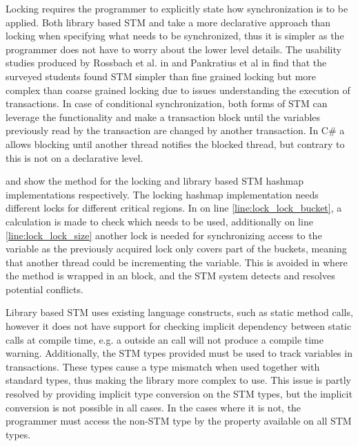 Locking requires the programmer to explicitly state how synchronization is to be applied. Both library based \ac{STM} and \stmname take a more declarative approach than locking when specifying what needs to be synchronized, thus it is simpler as the programmer does not have to worry about the lower level details. The usability studies produced by Rossbach et al. in \cite{rossbach2010transactional} and Pankratius et al in \cite{pankratius2009does} find that the surveyed students found \ac{STM} simpler than fine grained locking but more complex than coarse grained locking due to issues understanding the execution of transactions. In case of conditional synchronization, both forms of \ac{STM} can leverage the  functionality and make a transaction block until the variables previously read by the transaction are changed by another transaction. In C\# a  allows blocking until another thread notifies the blocked thread, but contrary to  this is not on a declarative level.

 and  show the  method for the locking and library based \ac{STM} hashmap implementations respectively. The locking hashmap implementation needs different locks for different critical regions. In  on line \ref{line:lock_lock_bucket}, a calculation is made to check which needs to be used, additionally on line \ref{line:lock_lock_size} another lock is needed for synchronizing access to the  variable as the previously acquired lock only covers part of the buckets, meaning that another thread could be incrementing the  variable. This is avoided in  where the method is wrapped in an  block, and the \ac{STM} system detects and resolves potential conflicts.

Library based \ac{STM} uses existing language constructs, such as static method calls, however it does not have support for checking implicit dependency between static calls at compile time, e.g. a  outside an  call will not produce a compile time warning. Additionally, the \ac{STM} types provided must be used to track variables in transactions. These types cause a type mismatch when used together with standard types, thus making the library more complex to use. This issue is partly resolved by providing implicit type conversion on the \ac{STM} types, but the implicit conversion is not possible in all cases. In the cases where it is not, the programmer must access the non-\ac{STM} type by the  property available on all \ac{STM} types. 


